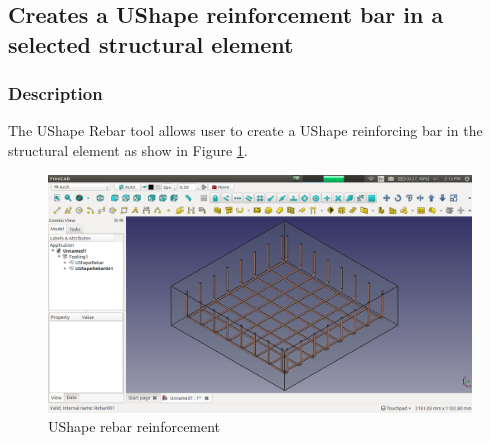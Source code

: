 \subsection{Creates a UShape reinforcement bar in a selected structural element}
\subsubsection{Description}
The UShape Rebar tool allows user to create a UShape reinforcing bar in the structural element as show in Figure \ref{ushaperebar}.

\begin{figure}
    \centering \includegraphics[scale=0.35]{images/Footing_UShapeRebar.png}
    \caption{UShape rebar reinforcement}
    \label{ushaperebar}
\end{figure}
